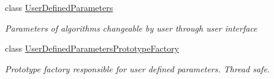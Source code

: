 \begin{DoxyCompactItemize}
class \mbox{\hyperlink{class_chess_tracking_1_1_image_processing_1_1_pipeline_data_1_1_user_defined_parameters}{User\+Defined\+Parameters}}
\begin{DoxyCompactList}\small\item\em Parameters of algorithms changeable by user through user interface \end{DoxyCompactList}\item 
class \mbox{\hyperlink{class_chess_tracking_1_1_image_processing_1_1_pipeline_data_1_1_user_defined_parameters_prototype_factory}{User\+Defined\+Parameters\+Prototype\+Factory}}
\begin{DoxyCompactList}\small\item\em Prototype factory responsible for user defined parameters. Thread safe. \end{DoxyCompactList}\end{DoxyCompactItemize}

